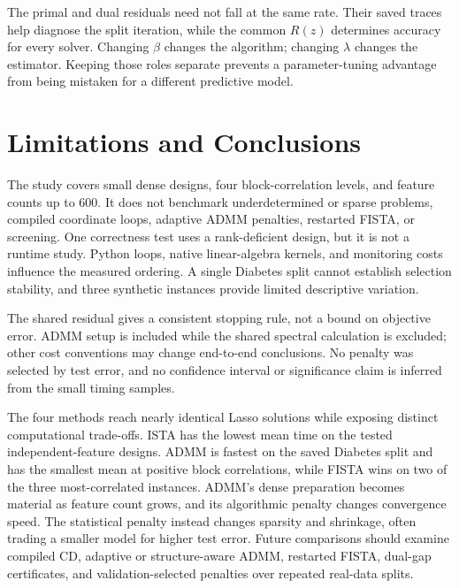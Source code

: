 \documentclass[10pt,letterpaper]{article}
\begin{document}
The primal and dual residuals need not fall at the same rate. Their saved traces help diagnose the split iteration, while the common $R(z)$ determines accuracy for every solver. Changing $\beta$ changes the algorithm; changing $\lambda$ changes the estimator. Keeping those roles separate prevents a parameter-tuning advantage from being mistaken for a different predictive model.

\FloatBarrier
\section{Limitations and Conclusions}
The study covers small dense designs, four block-correlation levels, and feature counts up to 600. It does not benchmark underdetermined or sparse problems, compiled coordinate loops, adaptive ADMM penalties, restarted FISTA, or screening. One correctness test uses a rank-deficient design, but it is not a runtime study. Python loops, native linear-algebra kernels, and monitoring costs influence the measured ordering. A single Diabetes split cannot establish selection stability, and three synthetic instances provide limited descriptive variation.

The shared residual gives a consistent stopping rule, not a bound on objective error. ADMM setup is included while the shared spectral calculation is excluded; other cost conventions may change end-to-end conclusions. No penalty was selected by test error, and no confidence interval or significance claim is inferred from the small timing samples.

The four methods reach nearly identical Lasso solutions while exposing distinct computational trade-offs. ISTA has the lowest mean time on the tested independent-feature designs. ADMM is fastest on the saved Diabetes split and has the smallest mean at positive block correlations, while FISTA wins on two of the three most-correlated instances. ADMM's dense preparation becomes material as feature count grows, and its algorithmic penalty changes convergence speed. The statistical penalty instead changes sparsity and shrinkage, often trading a smaller model for higher test error. Future comparisons should examine compiled CD, adaptive or structure-aware ADMM, restarted FISTA, dual-gap certificates, and validation-selected penalties over repeated real-data splits.
\end{document}
